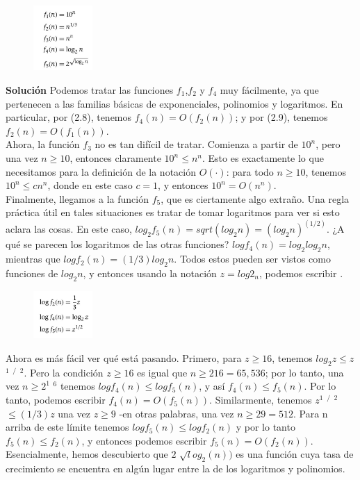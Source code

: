 \documentclass[a4paper, 12pt]{book}
\begin{document}
\begin{figure}[h] 
  \centering
    \includegraphics[width=0.2\textwidth]{Imagenes-Seccion2/form2_1.PNG}
\end{figure}

\textbf{Solución} Podemos tratar las funciones $f_1$,$ f_2$ y $f_4$ muy fácilmente, ya que pertenecen a las familias básicas de exponenciales, polinomios y logaritmos. En particular, por (2.8), tenemos $f_4 (n) = O (f_2 (n))$; y por (2.9), tenemos $f_2 (n) = O (f_1 (n))$.\\

Ahora, la función $f_3$ no es tan difícil de tratar. Comienza a partir de $10 ^ n$, pero una vez $n ≥ 10$, entonces claramente $10 ^ n ≤ n ^ n$. Esto es exactamente lo que necesitamos para la definición de la notación $O (·)$: para todo $n ≥ 10$, tenemos $10 ^ n ≤ cn ^ n$, donde en este caso $c = 1$, y entonces $10 ^ n = O (n ^ n)$.\\

Finalmente, llegamos a la función $f_5$, que es ciertamente algo extraño. Una regla práctica útil en tales situaciones es tratar de tomar logaritmos para ver si esto aclara las cosas. En este caso, $log_2 f_5 (n) = sqrt (log_2 n) = (log_2 n) ^ (1/2)$. ¿A qué se parecen los logaritmos de las otras funciones? $log f_4 (n) = log_2 log_2 n$, mientras que $log f_2 (n) = (1/3) log_2 n$. Todos estos pueden ser vistos como funciones de $log_2 n$, y entonces usando la notación $z = log2_n$, podemos escribir .

\begin{figure}[h] 
  \centering
    \includegraphics[width=0.2\textwidth]{Imagenes-Seccion2/form2_2.PNG}
\end{figure}

Ahora es más fácil ver qué está pasando. Primero, para $z ≥ 16$, tenemos $log_2 z ≤  z$  $^1$ $^/$ $^2$. Pero la condición $z ≥ 16$ es igual que $n ≥ 216 = 65, 536$; por lo tanto, una vez $n ≥ 2 ^1$ $^6$ tenemos $log f_4 (n) ≤ log f_5 (n)$, y así $f_4 (n) ≤ f_5 (n)$. Por lo tanto, podemos escribir $f_4 (n) = O (f_5 (n))$. Similarmente, tenemos $z^1$ $^/$ $^ 2$ $≤ (1/3)z$ una vez $z ≥ 9$ -en otras palabras, una vez $n ≥ 29 = 512$. Para n arriba de este límite tenemos $log f_5 (n) ≤ log f_2 (n)$ y por lo tanto $f_5 (n) ≤ f_2 (n)$, y entonces podemos escribir $f_5 (n) = O (f_2 (n))$. Esencialmente, hemos descubierto que $2$ $\sqrt log_2 (n))$ es una función cuya tasa de crecimiento se encuentra en algún lugar entre la de los logaritmos y polinomios.\\
\end{document}
